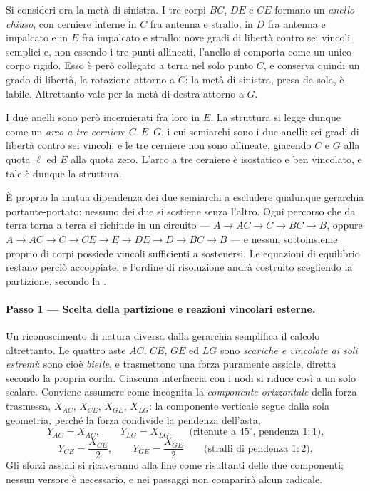 Si consideri ora la metà di sinistra. I tre corpi $BC$, $DE$
e $CE$ formano un \emph{anello chiuso}, con cerniere interne
in $C$ fra antenna e strallo, in $D$ fra antenna e
impalcato e in $E$ fra impalcato e strallo: nove gradi di
libertà contro sei vincoli semplici e, non essendo i tre
punti allineati, l'anello si comporta come un unico corpo
rigido. Esso è però collegato a terra nel solo punto $C$, e
conserva quindi un grado di libertà, la rotazione attorno a
$C$: la metà di sinistra, presa da sola, è labile.
Altrettanto vale per la metà di destra attorno a $G$.

I due anelli sono però incernierati fra loro in $E$. La
struttura si legge dunque come un \emph{arco a tre cerniere}
$C$--$E$--$G$, i cui semiarchi sono i due anelli: sei gradi
di libertà contro sei vincoli, e le tre cerniere non sono
allineate, giacendo $C$ e $G$ alla quota $\ell$ ed $E$ alla
quota zero. L'arco a tre cerniere è isostatico e ben
vincolato, e tale è dunque la struttura.

\begin{oss}
	È proprio la mutua dipendenza dei due semiarchi a
	escludere qualunque gerarchia portante-portato: nessuno
	dei due si sostiene senza l'altro. Ogni percorso che da
	terra torna a terra si richiude in un circuito ---
	$A \to AC \to C \to BC \to B$, oppure
	$A \to AC \to C \to CE \to E \to DE \to D \to BC \to B$
	--- e nessun sottoinsieme proprio di corpi possiede
	vincoli sufficienti a sostenersi. Le equazioni di
	equilibrio restano perciò accoppiate, e l'ordine di
	risoluzione andrà costruito scegliendo la partizione,
	secondo la .
\end{oss}


\paragraph{Passo 1 --- Scelta della partizione e reazioni
	vincolari esterne.}

Un riconoscimento di natura diversa dalla gerarchia
semplifica il calcolo altrettanto. Le quattro aste $AC$,
$CE$, $GE$ ed $LG$ sono \emph{scariche e vincolate ai soli
estremi}: sono cioè \emph{bielle}, e trasmettono una forza
puramente assiale, diretta secondo la propria corda.
Ciascuna interfaccia con i nodi si riduce così a un solo
scalare. Conviene assumere come incognita la
\emph{componente orizzontale} della forza trasmessa,
$X_{AC}$, $X_{CE}$, $X_{GE}$, $X_{LG}$: la componente
verticale segue dalla sola geometria, perché la forza
condivide la pendenza dell'asta,
\[
	Y_{AC} = X_{AC}, \qquad Y_{LG} = X_{LG}
	\qquad\text{(ritenute a $45^{\circ}$, pendenza $1:1$),}
\]
\[
	Y_{CE} = \frac{X_{CE}}{2}, \qquad Y_{GE} = \frac{X_{GE}}{2}
	\qquad\text{(stralli di pendenza $1:2$).}
\]
Gli sforzi assiali si ricaveranno alla fine come risultanti
delle due componenti; nessun versore è necessario, e nei
passaggi non comparirà alcun radicale.

